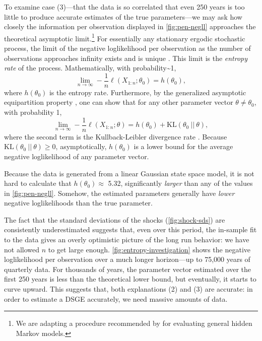 \documentclass[11pt]{article}
\begin{document}
To examine case (3)---that the data is so correlated that even 250 years
is too little to produce accurate estimates of the true parameters---we
may ask how closely the information per observation displayed in
\autoref{fig:pen-negll} approaches the theoretical asymptotic
limit.\footnote{We are adapting a procedure recommended by \citet{Andy-Fraser-on-HMMs} for evaluating general hidden Markov models.}
For essentially any stationary ergodic stochastic process, the limit of
the negative loglikelihood per observation as the number of observations
approaches infinity exists and is unique \citep{Gray-entropy-2nd}. This
limit is the \emph{entropy rate} of the process. Mathematically, with
probability\textasciitilde1, \[
\lim_{n\rightarrow\infty} -\frac{1}{n}\ell(X_{1:n}; \theta_0) = h(\theta_0),
\] where \(h(\theta_0)\) is the entropy rate. Furthermore, by the
generalized asymptotic equipartition property
\citep{Algoet-and-Cover-on-AEP}, one can show that for any other
parameter vector \(\theta \neq \theta_0\), with probability 1, \[
\lim_{n\rightarrow\infty} -\frac{1}{n}\ell(X_{1:n}; \theta) = h(\theta_0) + \mathrm{KL}(\theta_0\ ||\ \theta),
\] where the second term is the Kullback-Leibler divergence rate
\citep{Gray-entropy-2nd}. Because
\(\mathrm{KL}(\theta_0\ ||\ \theta) \geq 0\), asymptotically,
\(h(\theta_0)\) is a lower bound for the average negative loglikelihood
of any parameter vector.

Because the data is generated from a linear Gaussian state space model,
it is not hard to calculate that \(h(\theta_0) \approx\) 5.32,
significantly \emph{larger} than any of the values in
\autoref{fig:pen-negll}. Somehow, the estimated parameters generally
have \emph{lower} negative loglikelihoods than the true parameter.

The fact that the standard deviations of the shocks
(\autoref{fig:shock-sds}) are consistently underestimated suggests that,
even over this period, the in-sample fit to the data gives an overly
optimistic picture of the long run behavior: we have not allowed \(n\)
to get large enough. \autoref{fig:entropy-investigation} shows the
negative loglikelihood per observation over a much longer horizon---up
to 75,000 years of quarterly data. For thousands of years, the parameter
vector estimated over the first 250 years is less than the theoretical
lower bound, but eventually, it starts to curve upward. This suggests
that, both explanations (2) and (3) are accurate: in order to estimate a
DSGE accurately, we need massive amounts of data.
\end{document}
